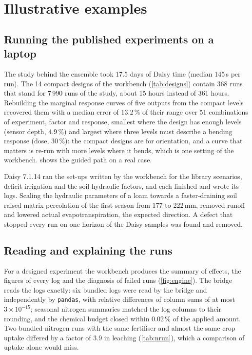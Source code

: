 \documentclass[preprint,12pt]{elsarticle}
\begin{document}
\section{Illustrative examples}
\subsection{Running the published experiments on a laptop}
The study behind the ensemble took 17.5 days of Daisy time (median 145\,s per run). The 14 compact designs of the workbench (\cref{tab:designs}) contain 368 runs that stand for 7\,990 runs of the study, about 15 hours instead of 361 hours. Rebuilding the marginal response curves of five outputs from the compact levels recovered them with a median error of 13.2\,\% of their range over 51 combinations of experiment, factor and response, smallest where the design has enough levels (sensor depth, 4.9\,\%) and largest where three levels must describe a bending response (dose, 30\,\%): the compact designs are for orientation, and a curve that matters is re-run with more levels where it bends, which is one setting of the workbench.  shows the guided path on a real case.


Daisy 7.1.14 ran the set-ups written by the workbench for the library scenarios, deficit irrigation and the soil-hydraulic factors, and each finished and wrote its logs. Scaling the hydraulic parameters of a loam towards a faster-draining soil raised matrix percolation of the first season from 177 to 222\,mm, removed runoff and lowered actual evapotranspiration, the expected direction. A defect that stopped every run on one horizon of the Daisy samples was found and removed.

\subsection{Reading and explaining the runs}
For a designed experiment the workbench produces the summary of effects, the figures of every log and the diagnosis of failed runs (\cref{fig:engine}). The bridge reads the logs exactly: six bundled logs were read by the bridge and independently by \texttt{pandas}, with relative differences of column sums of at most $3\times10^{-15}$; seasonal nitrogen summaries matched the log columns to their rounding, and the chemical budget closed within 0.02\,\% of the applied amount. Two bundled nitrogen runs with the same fertiliser and almost the same crop uptake differed by a factor of 3.9 in leaching (\cref{tab:nrun}), which a comparison of uptake alone would miss.
\end{document}

